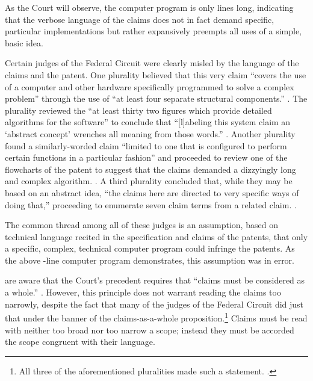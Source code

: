 \documentclass{scotus}
\begin{document}
As the Court will observe, the computer program is only \numlines lines long,
indicating that
the verbose language of the claims does not in fact demand specific, particular
implementations but rather expansively preempts all uses of a simple, basic
idea.

Certain
judges of the Federal Circuit were clearly misled by the language of the
claims and the patent.
One plurality believed that this very claim ``covers the use of a computer and
other hardware specifically programmed to solve a complex problem'' through the
use of ``at least four separate structural components.'' . The plurality reviewed the ``at least thirty two figures
which
provide detailed algorithms for the software'' to conclude that ``[l]abeling
this system claim an `abstract concept' wrenches all meaning from those words.''
. Another plurality found a
similarly-worded claim ``limited to one that is configured to perform certain
functions in a particular fashion'' and proceeded to review one of the
flowcharts of the patent to suggest that the claims demanded a dizzyingly long
and complex algorithm. . A third plurality concluded that, while they may be based
on an abstract idea, ``the claims here are directed to very specific ways of
doing that,'' proceeding to enumerate seven claim terms from a related claim.
.

The common thread among all of these judges is an assumption, based on technical
language recited in the specification and claims of the patents, that only a
specific, complex, technical computer program could infringe the patents. As the
above \numlines-line computer program demonstrates, this assumption was in
error.

\Amici are aware that the Court's precedent requires that ``claims must be
considered as a whole.'' . However, this principle does
not warrant reading the claims too narrowly, despite the fact that many of the
judges of the Federal Circuit did just that under the banner of the
claims-as-a-whole proposition.\footnote{%
All three of the aforementioned pluralities made such a statement.
.} Claims must be read with neither too broad nor too narrow a
scope; instead they must be accorded the scope congruent with their language.
\end{document}
